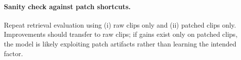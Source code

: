 \paragraph{Sanity check against patch shortcuts.} Repeat retrieval evaluation using (i) raw clips only and (ii) patched clips only. Improvements should transfer to raw clips; if gains exist only on patched clips, the model is likely exploiting patch artifacts rather than learning the intended factor.
